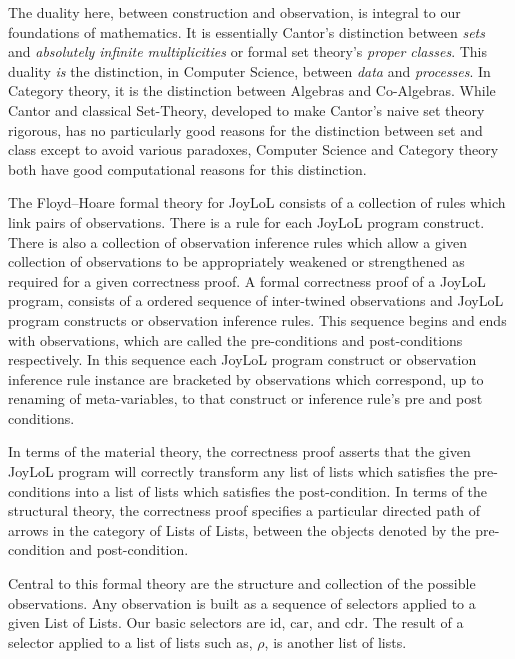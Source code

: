 \documentclass[a4paper,openany]{amsart}
\begin{document}
The duality here, between construction and observation, is integral to our
foundations of mathematics. It is essentially Cantor's distinction between
\emph{sets} and \emph{absolutely infinite multiplicities} or formal set theory's
\emph{proper classes}. This duality \emph{is} the distinction, in Computer
Science, between \emph{data} and \emph{processes}. In Category theory, it is the
distinction between Algebras and Co-Algebras. While Cantor and classical
Set-Theory, developed to make Cantor's naive set theory rigorous, has no
particularly good reasons for the distinction between set and class except to
avoid various paradoxes, Computer Science and Category theory both have good
computational reasons for this distinction. 

The Floyd–Hoare formal theory for JoyLoL consists of a collection of rules which
link pairs of observations. There is a rule for each JoyLoL program construct.
There is also a collection of observation inference rules which allow a given
collection of observations to be appropriately weakened or strengthened as
required for a given correctness proof. A formal correctness proof of a JoyLoL
program, consists of a ordered sequence of inter-twined observations and JoyLoL
program constructs or observation inference rules. This sequence begins and ends
with observations, which are called the pre-conditions and post-conditions
respectively. In this sequence each JoyLoL program construct or observation
inference rule instance are bracketed by observations which correspond, up to
renaming of meta-variables, to that construct or inference rule's pre and post
conditions.

In terms of the material theory, the correctness proof asserts that the given
JoyLoL program will correctly transform any list of lists which satisfies the
pre-conditions into a list of lists which satisfies the post-condition. In terms
of the structural theory, the correctness proof specifies a particular directed
path of arrows in the category of Lists of Lists, between the objects denoted by
the pre-condition and post-condition.

Central to this formal theory are the structure and collection of the possible
observations. Any observation is built as a sequence of selectors applied to a
given List of Lists. Our basic selectors are $\text{id}$, $\text{car}$, and
$\text{cdr}$. The result of a selector applied to a list of lists such as,
$\rho$, is another list of lists.
\end{document}
